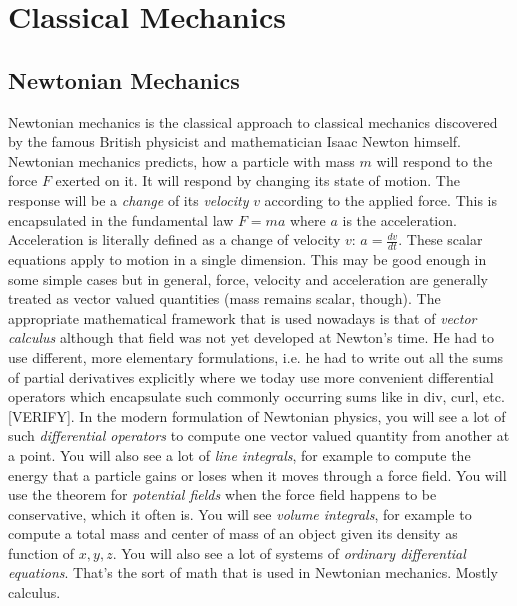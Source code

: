 \section{Classical Mechanics}




\subsection{Newtonian Mechanics}
Newtonian mechanics is the classical approach to classical mechanics discovered by the famous British physicist and mathematician Isaac Newton himself. Newtonian mechanics predicts, how a particle with mass $m$ will respond to the force $F$ exerted on it. It will respond by changing its state of motion. The response will be a \emph{change} of its \emph{velocity} $v$ according to the applied force. This is encapsulated in the fundamental law $F = m a$ where $a$ is the acceleration. Acceleration is literally defined as a change of velocity $v$: $a = \frac{dv}{dt}$. These scalar equations apply to motion in a single dimension. This may be good enough in some simple cases but in general, force, velocity and acceleration are generally treated as vector valued quantities (mass remains scalar, though). The appropriate mathematical framework that is used nowadays is that of \emph{vector calculus} although that field was not yet developed at Newton's time. He had to use different, more elementary formulations, i.e. he had to write out all the sums of partial derivatives explicitly where we today use more convenient differential operators which encapsulate such commonly occurring sums like in div, curl, etc. [VERIFY]. In the modern formulation of Newtonian physics, you will see a lot of such \emph{differential operators} to compute one vector valued quantity from another at a point. You will also see a lot of \emph{line integrals}, for example to compute the energy that a particle gains or loses when it moves through a force field. You will use the theorem for \emph{potential fields} when the force field happens to be conservative, which it often is. You will see \emph{volume integrals}, for example to compute a total mass and center of mass of an object given its density as function of $x,y,z$. You will also see a lot of systems of \emph{ordinary differential equations}. That's the sort of math that is used in Newtonian mechanics. Mostly calculus.

